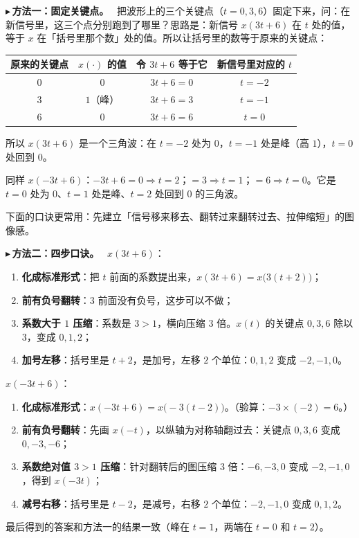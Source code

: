 \documentclass[UTF8,a4paper,11pt]{ctexart}
\newcounter{ex}[section]
\newcommand{\point}[1]{\par\addvspace{1ex}\noindent\textcolor{ptteal}{$\blacktriangleright$\,\textbf{#1}}\ }
\begin{document}
\point{方法一：固定关键点。}
把波形上的三个关键点（$t=0,3,6$）固定下来，问：在新信号里，这三个点分别跑到了哪里？思路是：新信号 $x(3t+6)$ 在 $t$ 处的值，等于 $x$ 在「括号里那个数」处的值。所以让括号里的数等于原来的关键点：
\begin{center}
\begin{tabular}{@{}cccc@{}}
\toprule
原来的关键点 & $x(\cdot)$ 的值 & 令 $3t+6$ 等于它 & 新信号里对应的 $t$\\
\midrule
$0$ & $0$ & $3t+6=0$ & $t=-2$\\
$3$ & $1$（峰）& $3t+6=3$ & $t=-1$\\
$6$ & $0$ & $3t+6=6$ & $t=0$\\
\bottomrule
\end{tabular}
\end{center}
所以 $x(3t+6)$ 是一个三角波：在 $t=-2$ 处为 $0$，$t=-1$ 处是峰（高 $1$），$t=0$ 处回到 $0$。

同样 $x(-3t+6)$：$-3t+6=0\Rightarrow t=2$；$=3\Rightarrow t=1$；$=6\Rightarrow t=0$。它是 $t=0$ 处为 $0$、$t=1$ 处是峰、$t=2$ 处回到 $0$ 的三角波。

下面的口诀更常用：先建立「信号移来移去、翻转过来翻转过去、拉伸缩短」的图像感。

\point{方法二：四步口诀。}
\textbf{$x(3t+6)$}：
\begin{enumerate}[nosep]
\item \textbf{化成标准形式}：把 $t$ 前面的系数提出来，$x(3t+6)=x\bigl(3(t+2)\bigr)$；
\item \textbf{前有负号翻转}：$3$ 前面没有负号，这步可以不做；
\item \textbf{系数大于 $1$ 压缩}：系数是 $3>1$，横向压缩 $3$ 倍。$x(t)$ 的关键点 $0,3,6$ 除以 $3$，变成 $0,1,2$；
\item \textbf{加号左移}：括号里是 $t+2$，是加号，左移 $2$ 个单位：$0,1,2$ 变成 $-2,-1,0$。
\end{enumerate}

\textbf{$x(-3t+6)$}：
\begin{enumerate}[nosep]
\item \textbf{化成标准形式}：$x(-3t+6)=x\bigl(-3(t-2)\bigr)$。（验算：$-3\times(-2)=6$。）
\item \textbf{前有负号翻转}：先画 $x(-t)$，以纵轴为对称轴翻过去：关键点 $0,3,6$ 变成 $0,-3,-6$；
\item \textbf{系数绝对值 $3>1$ 压缩}：针对翻转后的图压缩 $3$ 倍：$-6,-3,0$ 变成 $-2,-1,0$，得到 $x(-3t)$；
\item \textbf{减号右移}：括号里是 $t-2$，是减号，右移 $2$ 个单位：$-2,-1,0$ 变成 $0,1,2$。
\end{enumerate}
最后得到的答案和方法一的结果一致（峰在 $t=1$，两端在 $t=0$ 和 $t=2$）。
\end{document}
